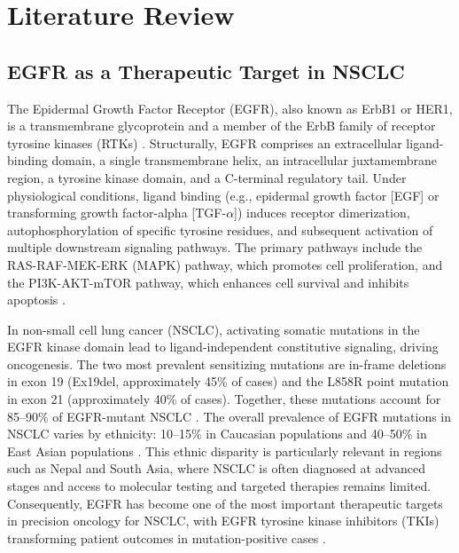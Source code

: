 \section{Literature Review}

\subsection{EGFR as a Therapeutic Target in NSCLC}

The Epidermal Growth Factor Receptor (EGFR), also known as ErbB1 or HER1, is a transmembrane glycoprotein and a member of the ErbB family of receptor tyrosine kinases (RTKs) \parencite{Siegeletal2023}. Structurally, EGFR comprises an extracellular ligand-binding domain, a single transmembrane helix, an intracellular juxtamembrane region, a tyrosine kinase domain, and a C-terminal regulatory tail. Under physiological conditions, ligand binding (e.g., epidermal growth factor [EGF] or transforming growth factor-alpha [TGF-$\alpha$]) induces receptor dimerization, autophosphorylation of specific tyrosine residues, and subsequent activation of multiple downstream signaling pathways. The primary pathways include the RAS-RAF-MEK-ERK (MAPK) pathway, which promotes cell proliferation, and the PI3K-AKT-mTOR pathway, which enhances cell survival and inhibits apoptosis \parencite{Siegeletal2023, RotowJanne2023}.

In non-small cell lung cancer (NSCLC), activating somatic mutations in the EGFR kinase domain lead to ligand-independent constitutive signaling, driving oncogenesis. The two most prevalent sensitizing mutations are in-frame deletions in exon 19 (Ex19del, approximately 45\% of cases) and the L858R point mutation in exon 21 (approximately 40\% of cases). Together, these mutations account for 85--90\% of EGFR-mutant NSCLC \parencite{RotowJanne2023}. The overall prevalence of EGFR mutations in NSCLC varies by ethnicity: 10--15\% in Caucasian populations and 40--50\% in East Asian populations \parencite{Siegeletal2023}. This ethnic disparity is particularly relevant in regions such as Nepal and South Asia, where NSCLC is often diagnosed at advanced stages and access to molecular testing and targeted therapies remains limited. Consequently, EGFR has become one of the most important therapeutic targets in precision oncology for NSCLC, with EGFR tyrosine kinase inhibitors (TKIs) transforming patient outcomes in mutation-positive cases \parencite{Passaroetal2021}.

